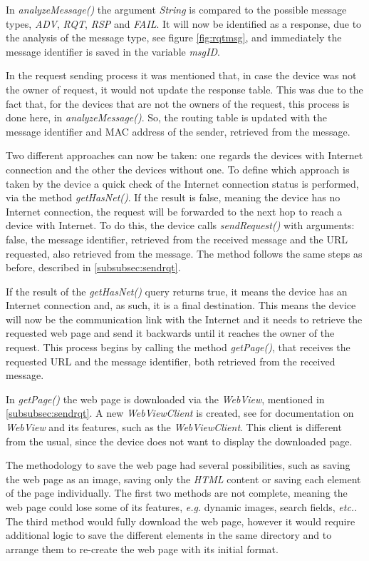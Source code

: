 In \textit{analyzeMessage()} the argument \textit{String} is compared to the possible message types, \textit{ADV}, \textit{RQT}, \textit{RSP} and \textit{FAIL}. It will now be identified as a response, due to the analysis of the message type, see figure \ref{fig:rqtmsg}, and immediately the message identifier is saved in the variable \textit{msgID}.

In the request sending process it was mentioned that, in case the device was not the owner of request, it would not update the response table. This was due to the fact that, for the devices that are not the owners of the request, this process is done here, in \textit{analyzeMessage()}. So, the routing table is updated with the message identifier and \gls{MAC} address of the sender, retrieved from the message.

Two different approaches can now be taken: one regards the devices with Internet connection and the other the devices without one. To define which approach is taken by the device a quick check of the Internet connection status is performed, via the method \textit{getHasNet()}. If the result is false, meaning the device has no Internet connection, the request will be forwarded to the next hop to reach a device with Internet. To do this, the device calls \textit{sendRequest()} with arguments: false, the message identifier, retrieved from the received message and the \gls{URL} requested, also retrieved from the message. The method follows the same steps as before, described in \ref{subsubsec:sendrqt}.

If the result of the \textit{getHasNet()} query returns true, it means the device has an Internet connection and, as such, it is a final destination. This means the device will now be the communication link with the Internet and it needs to retrieve the requested web page and send it backwards until it reaches the owner of the request. This process begins by calling the method \textit{getPage()}, that receives the requested \gls{URL} and the message identifier, both retrieved from the received message.

In \textit{getPage()} the web page is downloaded via the \textit{WebView}, mentioned in \ref{subsubsec:sendrqt}. A new \textit{WebViewClient} is created, see \cite{webview} for documentation on \textit{WebView} and its features, such as the \textit{WebViewClient}. This client is different from the usual, since the device does not want to display the downloaded page.

The methodology to save the web page had several possibilities, such as saving the web page as an image, saving only the \textit{HTML} content or saving each element of the page individually. The first two methods are not complete, meaning the web page could lose some of its features, \textit{e.g.} dynamic images, search fields, \textit{etc.}. The third method would fully download the web page, however it would require additional logic to save the different elements in the same directory and to arrange them to re-create the web page with its initial format.

